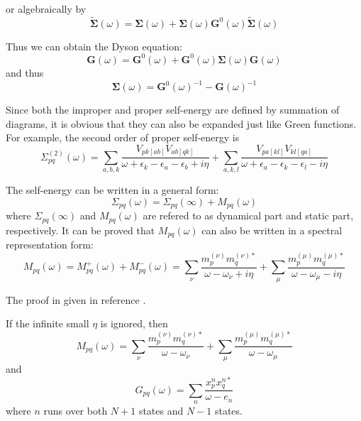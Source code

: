 or algebraically by
\begin{equation}
	\tilde{\boldsymbol{\Sigma}}(\omega)=\boldsymbol{\Sigma}(\omega)+\boldsymbol{\Sigma}(\omega) \boldsymbol{G}^0(\omega) \tilde{\boldsymbol{\Sigma}}(\omega)
\end{equation}

Thus we can obtain the Dyson equation:
\begin{equation}
	\boldsymbol{G}(\omega)=\boldsymbol{G}^{0}(\omega)+\boldsymbol{G}^{0}(\omega) \boldsymbol{\Sigma}(\omega) \boldsymbol{G}(\omega)
\end{equation}
and thus
\begin{equation}
	\boldsymbol{\Sigma}(\omega)=\boldsymbol{G}^{0}(\omega)^{-1}-\boldsymbol{G}(\omega)^{-1}
\end{equation}

Since both the improper and proper self-energy are defined by summation of diagrams, it is obvious that they can also be expanded just like Green functions.
For example, the second order of proper self-energy is
\begin{equation} \label{selforder2}
	\Sigma_{p q}^{(2)}(\omega)=\sum_{a, b, k} \frac{V_{p k[a b]} V_{a b[q k]}}{\omega+\epsilon_{k}-\epsilon_{a}-\epsilon_{b}+i \eta}+\sum_{a, k, l} \frac{V_{p a[k l]} V_{k l[q a]}}{\omega+\epsilon_{a}-\epsilon_{k}-\epsilon_{l}-i \eta}
\end{equation}

The self-energy can be written in a general form:
\begin{equation}
	\Sigma_{p q}(\omega)=\Sigma_{p q}(\infty)+M_{p q}(\omega)
\end{equation}
where $\Sigma_{p q}(\infty)$ and $M_{p q}(\omega)$ are refered to as dynamical part and static part, respectively.
It can be proved that $M_{pq}(\omega)$ can also be written in a spectral representation form:
\begin{equation}
	M_{p q}(\omega)=M_{p q}^{+}(\omega)+M_{p q}^{-}(\omega)=\sum_{\nu} \frac{m_{p}^{(\nu)} m_{q}^{(\nu) *}}{\omega-\omega_{\nu}+i \eta}+\sum_{\mu} \frac{m_{p}^{(\mu)} m_{q}^{(\mu) *}}{\omega-\omega_{\mu}-i \eta}
\end{equation}

The proof in given in reference \cite{Mpqproof1,Mpqproof2}.

If the infinite small $\eta$ is ignored, then 
\begin{equation}
	M_{p q}(\omega)=\sum_{\nu} \frac{m_{p}^{(\nu)} m_{q}^{(\nu) *}}{\omega-\omega_{\nu}}+\sum_{\mu} \frac{m_{p}^{(\mu)} m_{q}^{(\mu) *}}{\omega-\omega_{\mu}}
\end{equation}
and 
\begin{equation}
	G_{p q}(\omega)=\sum_{n} \frac{x_{p}^{n} x_{q}^{n *}}{\omega-e_{n}}
\end{equation}
where $n$ runs over both $N+1$ states and $N-1$ states.

